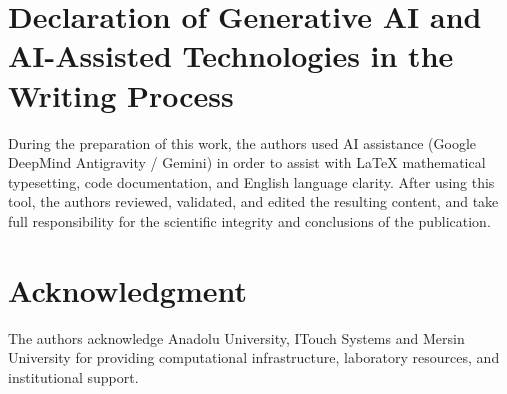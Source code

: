 \documentclass[10pt,journal,compsoc,twocolumn]{article}
\begin{document}
\section*{Declaration of Generative AI and AI-Assisted Technologies in the Writing Process}
During the preparation of this work, the authors used AI assistance (Google DeepMind Antigravity / Gemini) in order to assist with LaTeX mathematical typesetting, code documentation, and English language clarity. After using this tool, the authors reviewed, validated, and edited the resulting content, and take full responsibility for the scientific integrity and conclusions of the publication.

\section*{Acknowledgment}
The authors acknowledge Anadolu University, ITouch Systems and Mersin University for providing computational infrastructure, laboratory resources, and institutional support.



\end{document}
